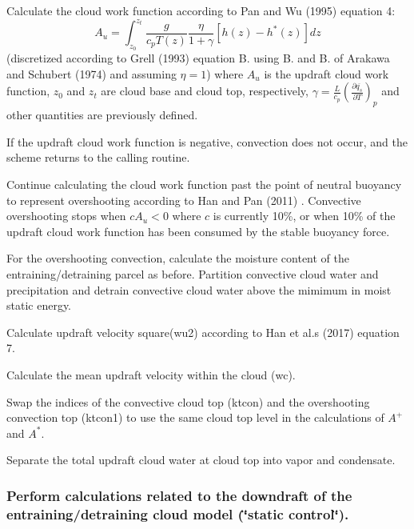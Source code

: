 \begin{DoxyItemize}
\item Calculate the cloud work function according to Pan and Wu (1995) \cite{pan_and_wu_1995} equation 4\+: \[ A_u=\int_{z_0}^{z_t}\frac{g}{c_pT(z)}\frac{\eta}{1 + \gamma}[h(z)-h^*(z)]dz \] (discretized according to Grell (1993) \cite{grell_1993} equation B. using B. and B. of Arakawa and Schubert (1974) \cite{arakawa_and_schubert_1974} and assuming $\eta=1$) where $A_u$ is the updraft cloud work function, $z_0$ and $z_t$ are cloud base and cloud top, respectively, $\gamma = \frac{L}{c_p}\left(\frac{\partial \overline{q_s}}{\partial T}\right)_p$ and other quantities are previously defined.
\item If the updraft cloud work function is negative, convection does not occur, and the scheme returns to the calling routine.
\item Continue calculating the cloud work function past the point of neutral buoyancy to represent overshooting according to Han and Pan (2011) \cite{han_and_pan_2011} . Convective overshooting stops when $ cA_u < 0$ where $c$ is currently 10\%, or when 10\% of the updraft cloud work function has been consumed by the stable buoyancy force.
\item For the overshooting convection, calculate the moisture content of the entraining/detraining parcel as before. Partition convective cloud water and precipitation and detrain convective cloud water above the mimimum in moist static energy.
\item Calculate updraft velocity square(wu2) according to Han et al.\textquotesingle{}s (2017) \cite{han_et_al_2017} equation 7.
\item Calculate the mean updraft velocity within the cloud (wc).
\item Swap the indices of the convective cloud top (ktcon) and the overshooting convection top (ktcon1) to use the same cloud top level in the calculations of $A^+$ and $A^*$.
\item Separate the total updraft cloud water at cloud top into vapor and condensate.
\end{DoxyItemize}

\subsubsection*{Perform calculations related to the downdraft of the entraining/detraining cloud model (\char`\"{}static control\char`\"{}).}


